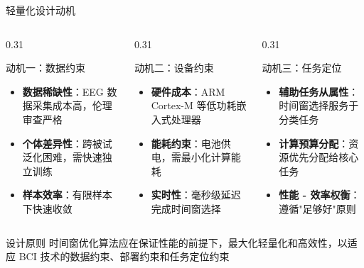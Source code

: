 \begin{frame}{轻量化设计动机}
    \begin{columns}[T]
        \begin{column}{0.31\textwidth}
            \begin{block}{\centering \normalsize 动机一：数据约束}
                \begin{itemize}
                    \item \textbf{数据稀缺性}：EEG 数据采集成本高，伦理审查严格
                    \item \textbf{个体差异性}：跨被试泛化困难，需快速独立训练
                    \item \textbf{样本效率}：有限样本下快速收敛
                \end{itemize}
            \end{block}
        \end{column}

        \begin{column}{0.31\textwidth}
            \begin{block}{\centering \normalsize 动机二：设备约束}
                \begin{itemize}
                    \item \textbf{硬件成本}：ARM Cortex-M 等低功耗嵌入式处理器
                    \item \textbf{能耗约束}：电池供电，需最小化计算能耗
                    \item \textbf{实时性}：毫秒级延迟完成时间窗选择
                \end{itemize}
            \end{block}
        \end{column}

        \begin{column}{0.31\textwidth}
            \begin{block}{\centering \normalsize 动机三：任务定位}
                \begin{itemize}
                    \item \textbf{辅助任务从属性}：时间窗选择服务于分类任务
                    \item \textbf{计算预算分配}：资源优先分配给核心任务
                    \item \textbf{性能 - 效率权衡}：遵循"足够好"原则
                \end{itemize}
            \end{block}
        \end{column}
    \end{columns}

    \vspace{0.5em}

    \begin{exampleblock}{\normalsize 设计原则}
        \centering 时间窗优化算法应在保证性能的前提下，最大化轻量化和高效性，以适应 BCI 技术的数据约束、部署约束和任务定位约束
    \end{exampleblock}
\end{frame}

